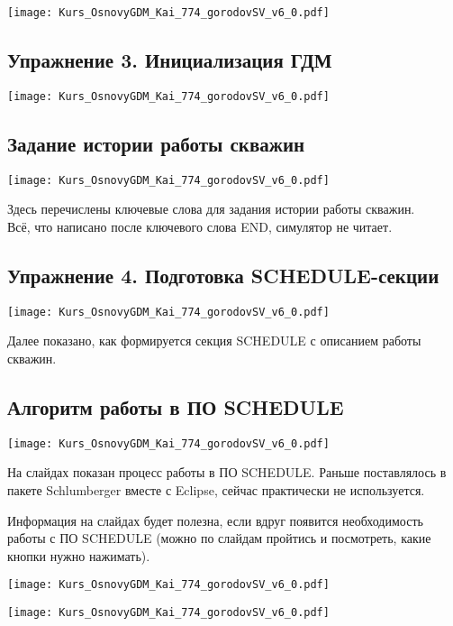 \documentclass[main.tex]{subfiles}
\begin{document}
\texttt{[image: Kurs\_OsnovyGDM\_Kai\_774\_gorodovSV\_v6\_0.pdf]}

\subsection{Упражнение 3. Инициализация ГДМ}

\texttt{[image: Kurs\_OsnovyGDM\_Kai\_774\_gorodovSV\_v6\_0.pdf]}

\subsection{Задание истории работы скважин}

\texttt{[image: Kurs\_OsnovyGDM\_Kai\_774\_gorodovSV\_v6\_0.pdf]}

Здесь перечислены ключевые слова для задания истории работы скважин.
\\

Всё, что написано после ключевого слова END, симулятор не читает.

\subsection{Упражнение 4. Подготовка SCHEDULE-секции}

\texttt{[image: Kurs\_OsnovyGDM\_Kai\_774\_gorodovSV\_v6\_0.pdf]}

Далее показано, как формируется секция SCHEDULE с описанием работы скважин.

\subsection{Алгоритм работы в ПО SCHEDULE}

\texttt{[image: Kurs\_OsnovyGDM\_Kai\_774\_gorodovSV\_v6\_0.pdf]}

На слайдах показан процесс работы в ПО SCHEDULE.
Раньше поставлялось в пакете Schlumberger вместе с Eclipse, сейчас практически не используется.

Информация на слайдах будет полезна, если вдруг появится необходимость работы с ПО SCHEDULE (можно по слайдам пройтись и посмотреть, какие кнопки нужно нажимать).

\texttt{[image: Kurs\_OsnovyGDM\_Kai\_774\_gorodovSV\_v6\_0.pdf]}

\texttt{[image: Kurs\_OsnovyGDM\_Kai\_774\_gorodovSV\_v6\_0.pdf]}
\end{document}
